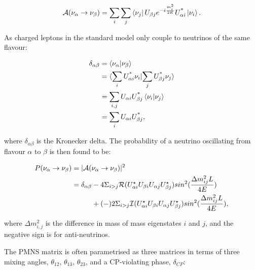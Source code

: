 \begin{equation}
\mathcal{A}(\nu_\alpha \rightarrow \nu_\beta) = \sum_i \sum_j \bra{\nu_j}U_{\beta j}e^{-i\frac{m_i^2}{2E}}U^{\text{*}}_{\alpha i}\ket{\nu_i}.
\end{equation}

As charged leptons in the standard model only couple to neutrinos of the same flavour:

 \begin{equation}
 \begin{aligned}
\delta_{\alpha\beta} &= \bra{\nu_\alpha}\ket{\nu_\beta}\\
&= \langle\sum_i U^{\text{*}}_{\alpha i}\nu_i}|{\sum_j U^{\text{*}}_{\beta j}\nu_j\rangle\\
&= \sum_{i,j}U_{\alpha i}U^{\text{*}}_{\beta j}\bra{\nu_i}\ket{\nu_j}\\
&=\sum_i U_{\alpha i}U^{\text{*}}_{\beta j},
 \end{aligned}
\end{equation}

where $\delta_{\alpha\beta}$ is the Kronecker delta. The probability of a neutrino oscillating from flavour $\alpha$ to $\beta$ is then found to be:

\begin{equation}
\begin{aligned}
P(\nu_\alpha \rightarrow \nu_\beta) &= |\mathcal{A}(\nu_\alpha \rightarrow \nu_\beta)|^2 \\
&= \delta_{\alpha\beta} - 4 \Sigma_{i>j}\mathcal{R}(U_{\alpha i}^\star U_{\beta i} U_{\alpha j} U_{\beta j}^\star) sin^2 (\frac{\Delta m^2_{ij}L}{4E})\\ 
&\hphantom{= \delta_{\alpha\beta}.}+(-) 2 \Sigma_{i>j}\mathcal{I}(U_{\alpha i}^\star U_{\beta i} U_{\alpha j} U_{\beta j}^\star) sin^2 (\frac{\Delta m^2_{ij}L}{4E}),
\end{aligned}
\label{eqn:oscprob}
\end{equation}

where $\Delta m^{2}_{i,j}$ is the difference in mass of mass eigenstates $i$ and $j$, and the negative sign is for anti-neutrinos.

The PMNS matrix is often parametrised as three matrices in terms of three mixing angles, $\theta_{12}$, $\theta_{13}$, $\theta_{23}$, and a CP-violating phase, $\delta_{CP}$:

